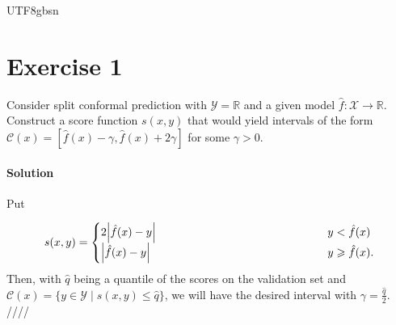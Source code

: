 \documentclass[../main.tex]{subfiles}
\begin{document}
\begin{CJK*}{UTF8}{gbsn}

\section*{Exercise 1}

Consider split conformal prediction with $\mathcal{Y} = \mathbb{R}$
and a given model $\hat{f}: \mathcal{X} \to \mathbb{R}$.
Construct a score function $s(x,y)$
that would yield intervals of the form $\mathcal{C}(x) 
= [\hat{f}(x) - \gamma, \hat{f}(x) + 2 \gamma]$ for some $\gamma > 0$.

\paragraph{Solution}
Put 

\begin{equation*}
  s(x,y) = 
  \begin{cases}
    2 \abs{\hat{f}(x)-y} \tab[5cm] & y < \hat{f}(x) \\
    \abs{\hat{f}(x)-y} \tab[5.1cm] & y \geqslant \hat{f}(x).
  \end{cases}
\end{equation*}
Then, with $\hat{q}$
being a quantile of the scores on the validation set
and $\mathcal{C}(x) = \{y \in \mathcal{Y} \mid s(x,y) \leqslant \hat{q}\}$,
we will have the desired interval with $\gamma = \frac{\hat{q}}{2}$.
////

\end{CJK*}
\end{document}
